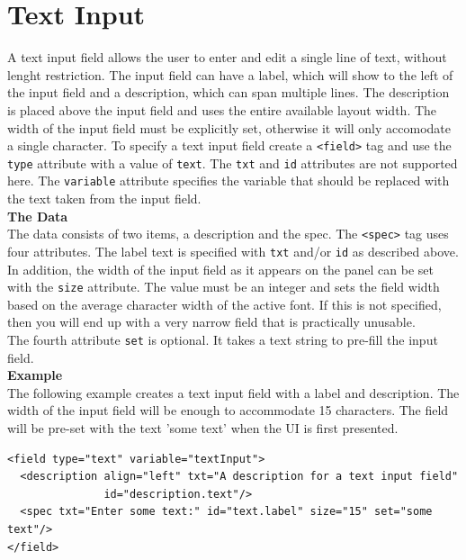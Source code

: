 \section{Text Input}

A text input field allows the user to enter and edit a single line of
text, without lenght restriction. The input field can have a label,
which will show to the left of the input field and a description, which
can span multiple lines. The description is placed above the input field
and uses the entire available layout width. The width of the input field
must be explicitly set, otherwise it will only accomodate a single
character. To specify a text input field create a \texttt{<field>} tag
and use the \texttt{type} attribute with a value of \texttt{text}. The
\texttt{txt} and \texttt{id} attributes are not supported here. The
\texttt{variable} attribute specifies the variable that should be
replaced with the text taken from the input field.\\

\textbf{The Data}\\

The data consists of two items, a description and the spec. The
\texttt{<spec>} tag uses four attributes. The label text is specified with
\texttt{txt} and/or \texttt{id} as described above. In addition, the
width of the input field as it appears on the panel can be set with the
\texttt{size} attribute. The value must be an integer and sets the field
width based on the average character width of the active font. If this
is not specified, then you will end up with a very narrow field that is
practically unusable.\\

The fourth attribute \texttt{set} is optional. It takes a text string to
pre-fill the input field.\\

\textbf{Example}\\

The following example creates a text input field with a label and
description. The width of the input field will be enough to accommodate
15 characters. The field will be pre-set with the text 'some text' when
the UI is first presented.\\

\footnotesize
\begin{verbatim}
<field type="text" variable="textInput">
  <description align="left" txt="A description for a text input field"
               id="description.text"/>
  <spec txt="Enter some text:" id="text.label" size="15" set="some text"/>
</field>
\end{verbatim}
\normalsize

